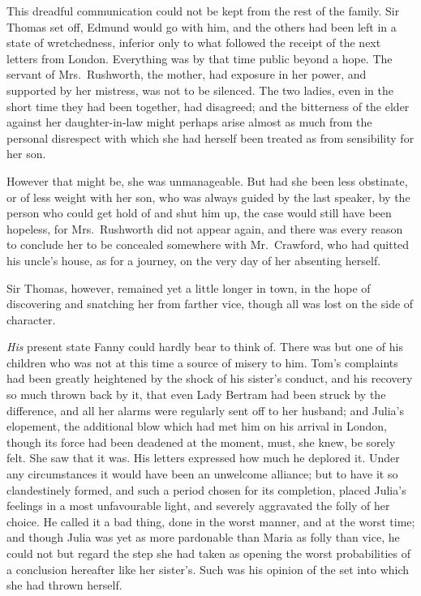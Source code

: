 This dreadful communication could not be kept from the rest
of the family.  Sir Thomas set off, Edmund would go with him,
and the others had been left in a state of wretchedness,
inferior only to what followed the receipt of the next
letters from London.  Everything was by that time public
beyond a hope.  The servant of Mrs.\ Rushworth, the mother,
had exposure in her power, and supported by her mistress,
was not to be silenced.  The two ladies, even in the short
time they had been together, had disagreed; and the bitterness
of the elder against her daughter-in-law might perhaps arise
almost as much from the personal disrespect with which
she had herself been treated as from sensibility for her son.

However that might be, she was unmanageable.  But had she
been less obstinate, or of less weight with her son,
who was always guided by the last speaker, by the person
who could get hold of and shut him up, the case would
still have been hopeless, for Mrs.\ Rushworth did not
appear again, and there was every reason to conclude
her to be concealed somewhere with Mr.\ Crawford,
who had quitted his uncle's house, as for a journey,
on the very day of her absenting herself.

Sir Thomas, however, remained yet a little longer in town,
in the hope of discovering and snatching her from farther vice,
though all was lost on the side of character.

\emph{His} present state Fanny could hardly bear to think of.
There was but one of his children who was not at this time
a source of misery to him.  Tom's complaints had been
greatly heightened by the shock of his sister's conduct,
and his recovery so much thrown back by it, that even
Lady Bertram had been struck by the difference, and all
her alarms were regularly sent off to her husband;
and Julia's elopement, the additional blow which had met
him on his arrival in London, though its force had been
deadened at the moment, must, she knew, be sorely felt.
She saw that it was.  His letters expressed how much he
deplored it.  Under any circumstances it would have been
an unwelcome alliance; but to have it so clandestinely
formed, and such a period chosen for its completion,
placed Julia's feelings in a most unfavourable light,
and severely aggravated the folly of her choice.
He called it a bad thing, done in the worst manner,
and at the worst time; and though Julia was yet as more
pardonable than Maria as folly than vice, he could not
but regard the step she had taken as opening the worst
probabilities of a conclusion hereafter like her sister's.
Such was his opinion of the set into which she had
thrown herself.

